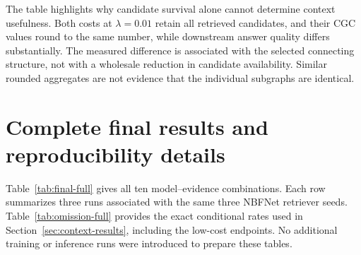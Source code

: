 \begin{table}[h]
 \centering
 \caption{Evidence results, mean $\pm$ standard deviation across three NBFNet seeds. CCC: macro candidate coverage; Red.: pooled candidate reduction in percent; CGC: context gold coverage; CFGC: full context gold coverage. Constant and semantic rows differ only in their edge-cost definition and scale.}
 \label{tab:evidence-full}
 
\end{table}

The table highlights why candidate survival alone cannot determine context usefulness. Both costs at $\lambda=0.01$ retain all retrieved candidates, and their CGC values round to the same number, while downstream answer quality differs substantially. The measured difference is associated with the selected connecting structure, not with a wholesale reduction in candidate availability. Similar rounded aggregates are not evidence that the individual subgraphs are identical.

\section{Complete final results and reproducibility details}
\label{app:final-results}

Table~\ref{tab:final-full} gives all ten model--evidence combinations. Each row summarizes three runs associated with the same three NBFNet retriever seeds. Table~\ref{tab:omission-full} provides the exact conditional rates used in Section~\ref{sec:context-results}, including the low-cost endpoints. No additional training or inference runs were introduced to prepare these tables.

\begin{table}[h]
 \centering
 \caption{Complete final-answer results. P and R are micro precision and recall; EM is Exact Match; tokens are total input plus output tokens in millions per run. SP denotes shortest-path union, C constant PCST, and S semantic PCST. All entries are mean $\pm$ standard deviation across three runs.}
 \label{tab:final-full}
 
\end{table}

\begin{table}[h]
 \centering
 \caption{LLMOmissionGivenFullContext for every evaluated evidence setting. Lower is better. Conditioning is on full gold-entity coverage in each run's evidence, not on a shared fixed subset across all construction strategies.}
 \label{tab:omission-full}
 
\end{table}

